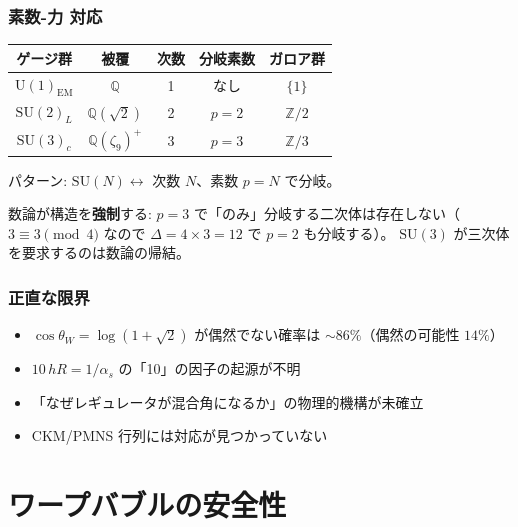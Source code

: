 \documentclass[12pt,a4paper]{article}
\begin{document}
\section{素数-力 対応}

\begin{resultbox}
\begin{center}
\renewcommand{\arraystretch}{1.4}
\begin{tabular}{ccccc}
\toprule
ゲージ群 & 被覆 & 次数 & 分岐素数 & ガロア群 \\
\midrule
$\mathrm{U}(1)_\mathrm{EM}$ & $\mathbb{Q}$ & 1 & なし & $\{1\}$ \\
$\mathrm{SU}(2)_L$ & $\mathbb{Q}(\sqrt{2})$ & 2 & $p=2$ & $\mathbb{Z}/2$ \\
$\mathrm{SU}(3)_c$ & $\mathbb{Q}(\zeta_9)^+$ & 3 & $p=3$ & $\mathbb{Z}/3$ \\
\bottomrule
\end{tabular}
\end{center}

パターン: $\mathrm{SU}(N) \leftrightarrow$ 次数 $N$、素数 $p=N$ で分岐。

数論が構造を\textbf{強制}する:
$p=3$ で「のみ」分岐する二次体は存在しない（$3 \equiv 3 \pmod{4}$ なので $\Delta = 4 \times 3 = 12$ で $p=2$ も分岐する）。
$\mathrm{SU}(3)$ が三次体を要求するのは数論の帰結。
\end{resultbox}

\section{正直な限界}

\begin{honestbox}[未解決の問題]
\begin{itemize}
\item $\cos\theta_W = \log(1+\sqrt{2})$ が偶然でない確率は $\sim 86\%$（偶然の可能性 $14\%$）
\item $10\,hR = 1/\alpha_s$ の「10」の因子の起源が不明
\item 「なぜレギュレータが混合角になるか」の物理的機構が未確立
\item CKM/PMNS 行列には対応が見つかっていない
\end{itemize}
\end{honestbox}

\part{ワープバブルの安全性}
\end{document}
